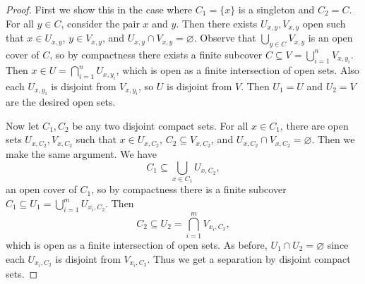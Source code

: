 \begin{proof}
  First we show this in the case where
  $C_1 = \{x\}$ is a singleton and $C_2 = C$.
  For all $y \in C$, consider the pair $x$ and $y$.
  Then there exists $U_{x, y}, V_{x, y}$ open
  such that $x \in U_{x, y}$, $y \in V_{x, y}$,
  and $U_{x, y} \cap V_{x, y} = \varnothing$. Observe
  that $\bigcup_{y \in C} V_{x, y}$ is an open cover
  of $C$, so by compactness there exists
  a finite subcover $C \subseteq V = \bigcup_{i = 1}^n V_{x, y_i}$.
  Then $x \in U = \bigcap_{i = 1}^n U_{x, y_i}$,
  which is open as a finite intersection of
  open sets. Also each $U_{x, y_i}$ is disjoint
  from $V_{x, y_i}$, so $U$ is disjoint from $V$.
  Then $U_1 = U$ and $U_2 = V$ are the desired
  open sets.

  Now let $C_1, C_2$ be any two disjoint compact sets.
  For all $x \in C_1$, there are open sets
  $U_{x, C_2}, V_{x, C_2}$ such that $x \in U_{x, C_2}$,
  $C_2 \subseteq V_{x, C_2}$, and $U_{x, C_2} \cap V_{x, C_2} = \varnothing$.
  Then we make the same argument.
  We have
  \[
    C_1 \subseteq \bigcup_{x \in C_1} U_{x, C_2},
  \]
  an open cover of $C_1$, so by compactness there
  is a finite subcover
  $C_1 \subseteq U_1 = \bigcup_{i = 1}^m U_{x_i, C_2}$.
  Then
  \[C_2 \subseteq U_2 = \bigcap_{i = 1}^m V_{x_i, C_2},\]
  which is open as a finite intersection of
  open sets. As before, $U_1 \cap U_2 = \varnothing$
  since each $U_{x_i, C_2}$ is disjoint from
  $V_{x_i, C_2}$. Thus we get a separation
  by disjoint compact sets.
\end{proof}
